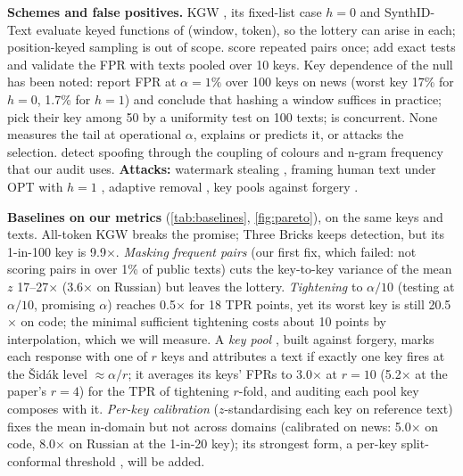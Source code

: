 \documentclass{article}
\theoremstyle{plain}
\begin{document}
\textbf{Schemes and false positives.} KGW \citep{kirchenbauer2023watermark}, its fixed-list case $h=0$ \citep{zhao2024provable} and SynthID-Text \citep{dathathri2024scalable} evaluate keyed functions of (window, token), so the lottery can arise in each; position-keyed sampling \citep{kuditipudi2024robust} is out of scope. \citet{kirchenbauer2024reliability} score repeated pairs once; \citet{fernandez2023three} add exact tests and validate the FPR with texts pooled over 10 keys. Key dependence of the null has been noted: \citet{gloaguen2026diffusion} report FPR at $\alpha=1\%$ over 100 keys on news (worst key 17\% for $h=0$, 1.7\% for $h=1$) and conclude that hashing a window suffices in practice; \citet{fernandez2025posthoc} pick their key among 50 by a uniformity test on 100 texts; \citet{li2026tiwm} is concurrent. None measures the tail at operational $\alpha$, explains or predicts it, or attacks the selection. \citet{gloaguen2025spoofing} detect spoofing through the coupling of colours and n-gram frequency that our audit uses. \textbf{Attacks:} watermark stealing \citep{jovanovic2024stealing}, framing human text under OPT with $h=1$ \citep{sadasivan2025reliably}, adaptive removal \citep{diaa2025optimizing}, key pools against forgery \citep{aremu2026randomized}.

\textbf{Baselines on our metrics} (\cref{tab:baselines}, \cref{fig:pareto}), on the same keys and texts. All-token KGW breaks the promise; Three Bricks keeps detection, but its 1-in-100 key is 9.9$\times$. \emph{Masking frequent pairs} (our first fix, which failed: not scoring pairs in over 1\% of public texts) cuts the key-to-key variance of the mean $z$ 17--27$\times$ (3.6$\times$ on Russian) but leaves the lottery. \emph{Tightening} to $\alpha/10$ (testing at $\alpha/10$, promising $\alpha$) reaches 0.5$\times$ for 18 TPR points, yet its worst key is still 20.5$\times$ on code; the minimal sufficient tightening costs about 10 points by interpolation, which we will measure. A \emph{key pool} \citep{aremu2026randomized}, built against forgery, marks each response with one of $r$ keys and attributes a text if exactly one key fires at the Šidák level ${\approx}\alpha/r$; it averages its keys' FPRs to 3.0$\times$ at $r=10$ (5.2$\times$ at the paper's $r=4$) for the TPR of tightening $r$-fold, and auditing each pool key composes with it. \emph{Per-key calibration} ($z$-standardising each key on reference text) fixes the mean in-domain but not across domains (calibrated on news: 5.0$\times$ on code, 8.0$\times$ on Russian at the 1-in-20 key); its strongest form, a per-key split-conformal threshold \citep{xie2025classroom}, will be added.
\end{document}
